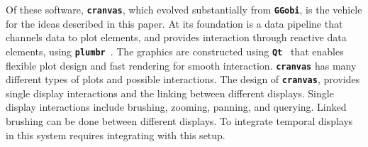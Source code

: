 \documentclass[12pt]{article}
\newcommand{\red}[1]{{\color{red} #1}}
\begin{document}
Of these software, \texttt{\textbf{cranvas}}, which evolved substantially from  \texttt{\textbf{GGobi}}, is the vehicle for the ideas described in this paper.
At its foundation is a data pipeline that channels data to
plot elements, and provides interaction through reactive data
elements, using \texttt{\textbf{plumbr}}~\citep{plumbr2014}. The
graphics are constructed using \texttt{\textbf{Qt}}~\citep{Qt}
that enables flexible plot design and fast rendering for smooth
interaction. \texttt{\textbf{cranvas}} has
many different types of plots and possible interactions.
The design of \texttt{\textbf{cranvas}}, \citet{xie2014reactive} provides single display interactions and the linking between different displays. Single display interactions include brushing, zooming, panning, and querying. Linked brushing can be done between different displays. To integrate temporal displays in this system requires integrating with this setup. %


\end{document}
